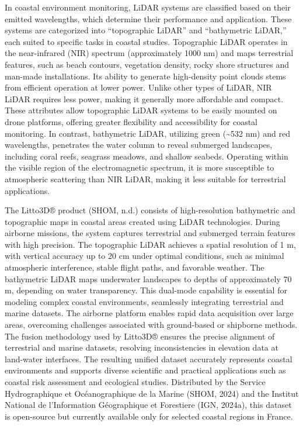\documentclass[
  letterpaper,
  11pt,
  english,
  singlespacing,
  headsepline]{MastersDoctoralThesis}
\begin{document}
\begin{spacing}{1.5}
In coastal environment monitoring, LiDAR systems are classified based on
their emitted wavelengths, which determine their performance and
application. These systems are categorized into ``topographic LiDAR''
and ``bathymetric LiDAR,'' each suited to specific tasks in coastal
studies. Topographic LiDAR operates in the near-infrared (NIR) spectrum
(approximately 1000 nm) and maps terrestrial features, such as beach
contours, vegetation density, rocky shore structures and man-made
installations. Its ability to generate high-density point clouds stems
from efficient operation at lower power. Unlike other types of LiDAR,
NIR LiDAR requires less power, making it generally more affordable and
compact. These attributes allow topographic LiDAR systems to be easily
mounted on drone platforms, offering greater flexibility and
accessibility for coastal monitoring. In contrast, bathymetric LiDAR,
utilizing green (\textasciitilde532 nm) and red wavelengths, penetrates
the water column to reveal submerged landscapes, including coral reefs,
seagrass meadows, and shallow seabeds. Operating within the visible
region of the electromagnetic spectrum, it is more susceptible to
atmospheric scattering than NIR LiDAR, making it less suitable for
terrestrial applications.

The Litto3D® product (SHOM, n.d.) consists of high-resolution
bathymetric and topographic maps in coastal areas created using LiDAR
technologies. During airborne missions, the system captures terrestrial
and submerged terrain features with high precision. The topographic
LiDAR achieves a spatial resolution of 1 m, with vertical accuracy up to
20 cm under optimal conditions, such as minimal atmospheric
interference, stable flight paths, and favorable weather. The
bathymetric LiDAR maps underwater landscapes to depths of approximately
70 m, depending on water transparency. This dual-mode capability is
essential for modeling complex coastal environments, seamlessly
integrating terrestrial and marine datasets. The airborne platform
enables rapid data acquisition over large areas, overcoming challenges
associated with ground-based or shipborne methods. The fusion
methodology used by Litto3D® ensures the precise alignment of
terrestrial and marine datasets, resolving inconsistencies in elevation
data at land-water interfaces. The resulting unified dataset accurately
represents coastal environments and supports diverse scientific and
practical applications such as coastal risk assessment and ecological
studies. Distributed by the Service Hydrographique et Océanographique de
la Marine (SHOM, 2024) and the Institut National de l'Information
Géographique et Forestiere (IGN, 2024a), this dataset is open-source but
currently available only for selected coastal regions in France.


\end{spacing}
\end{document}
